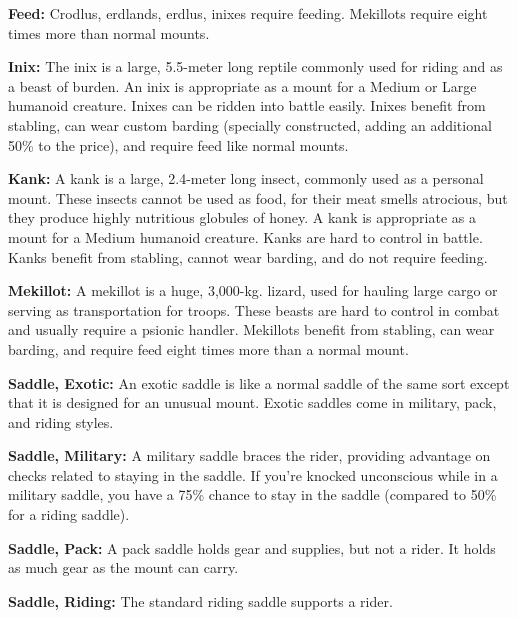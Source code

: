\textbf{Feed:} Crodlus, erdlands, erdlus, inixes require feeding. Mekillots require eight times more than normal mounts.

\textbf{Inix:} The inix is a large, 5.5-meter long reptile commonly used for riding and as a beast of burden. An inix is appropriate as a mount for a Medium or Large humanoid creature. Inixes can be ridden into battle easily. Inixes benefit from stabling, can wear custom barding (specially constructed, adding an additional 50\% to the price), and require feed like normal mounts.

\textbf{Kank:} A kank is a large, 2.4-meter long insect, commonly used as a personal mount. These insects cannot be used as food, for their meat smells atrocious, but they produce highly nutritious globules of honey. A kank is appropriate as a mount for a Medium humanoid creature. Kanks are hard to control in battle. Kanks benefit from stabling, cannot wear barding, and do not require feeding.

\textbf{Mekillot:} A mekillot is a huge, 3,000-kg. lizard, used for hauling large cargo or serving as transportation for troops. These beasts are hard to control in combat and usually require a psionic handler. Mekillots benefit from stabling, can wear barding, and require feed eight times more than a normal mount.

\textbf{Saddle, Exotic:} An exotic saddle is like a normal saddle of the same sort except that it is designed for an unusual mount. Exotic saddles come in military, pack, and riding styles.

\textbf{Saddle, Military:} A military saddle braces the rider, providing advantage on  checks related to staying in the saddle. If you're knocked unconscious while in a military saddle, you have a 75\% chance to stay in the saddle (compared to 50\% for a riding saddle).

\textbf{Saddle, Pack:} A pack saddle holds gear and supplies, but not a rider. It holds as much gear as the mount can carry.

\textbf{Saddle, Riding:} The standard riding saddle supports a rider.